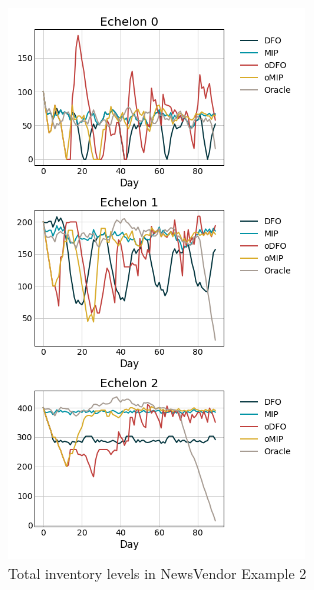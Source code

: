 \documentclass[12pt]{article}
\begin{document}
\begin{figure}[!htbp]
    \centering
    \includegraphics[width=0.7\textwidth]{NewsVendor_LostSales_inventory.png}
    \caption{Total inventory levels in NewsVendor Example 2}
    \label{fig:NV_LostSales_inv}
\end{figure}
\end{document}

